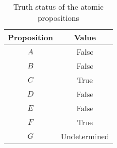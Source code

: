 \documentclass[letterpaper,headings=standardclasses]{scrartcl}
\begin{document}
\begin{table}[h]
    \centering
    \begin{tabular}{|c|c|}
    \hline
    Proposition & Value \\ \hline
    $A$ & False \\ \hline
    $B$ & False \\ \hline
    $C$ & True \\ \hline
    $D$ & False \\ \hline
    $E$ & False \\ \hline
    $F$ & True \\ \hline
    $G$ & Undetermined \\ \hline
    \end{tabular}
    \caption{Truth status of the atomic propositions}
    \label{tt}
\end{table}
\end{document}

